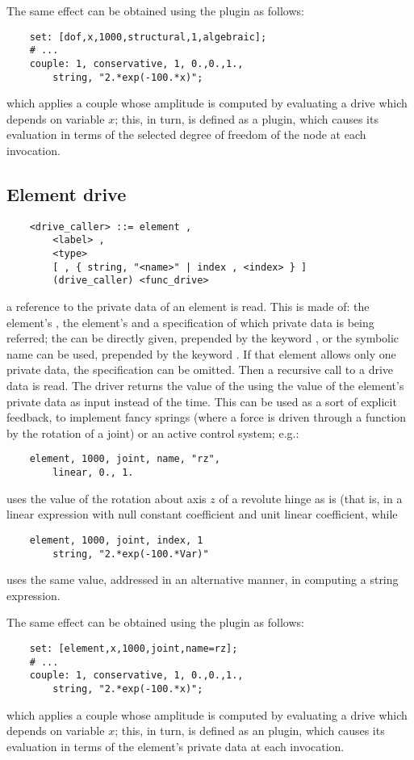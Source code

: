 \noindent
The same effect can be obtained using the  plugin as follows:
\begin{verbatim}
    set: [dof,x,1000,structural,1,algebraic];
    # ...
    couple: 1, conservative, 1, 0.,0.,1.,
        string, "2.*exp(-100.*x)";
\end{verbatim}
which applies a couple whose amplitude is computed by evaluating
a  drive which depends on variable $x$; this, in turn,
is defined as a  plugin, which causes its evaluation
in terms of the selected degree of freedom of the node at each invocation.


\subsection{Element drive}\label{sec:DRIVE-ELEMENT}
\begin{verbatim}
    <drive_caller> ::= element ,
        <label> ,
        <type>
        [ , { string, "<name>" | index , <index> } ]
        (drive_caller) <func_drive>
\end{verbatim}
a reference to the private data of an element is read.
This is made of: the element's , the element's 
and a specification of which private data is being referred;
the  can be directly given, prepended by the keyword
, or the symbolic name can be used, prepended by 
the keyword .
If that element allows only one private data, the specification 
can be omitted.
Then a recursive call to a drive data is read. 
The driver returns the value of the  
 using the value of the 
element's private data as input instead of the time. 
This can be used as a sort of explicit feedback, to implement fancy
springs (where a force is driven through a function by the rotation
of a joint) or an active control system; e.g.:
\begin{verbatim}
    element, 1000, joint, name, "rz",
        linear, 0., 1.
\end{verbatim}
uses the value of the rotation about axis $z$ of a revolute hinge
as is (that is, in a linear expression with null constant coefficient 
and unit linear coefficient, while
\begin{verbatim}
    element, 1000, joint, index, 1
        string, "2.*exp(-100.*Var)"
\end{verbatim}
uses the same value, addressed in an alternative manner, in computing
a string expression.

\noindent
The same effect can be obtained using the  plugin as follows:
\begin{verbatim}
    set: [element,x,1000,joint,name=rz];
    # ...
    couple: 1, conservative, 1, 0.,0.,1.,
        string, "2.*exp(-100.*x)";
\end{verbatim}
which applies a couple whose amplitude is computed by evaluating
a  drive which depends on variable $x$; this, in turn,
is defined as an  plugin, which causes its evaluation
in terms of the element's private data at each invocation.

